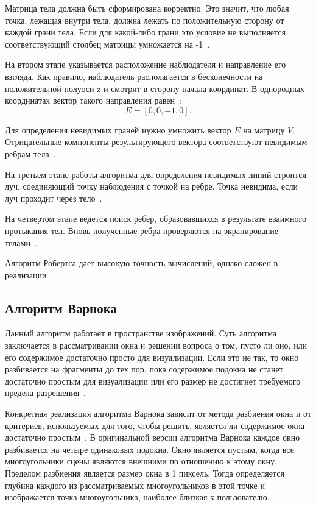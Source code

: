 Матрица тела должна быть сформирована корректно. Это значит, что любая
точка, лежащая внутри тела, должна лежать по положительную сторону от каждой
грани тела. Если для какой-либо грани это условие не выполняется,
соответствующий столбец матрицы умножается на -1~\cite{rojers}.

На втором этапе указывается расположение наблюдателя и направление его
взгляда. Как правило, наблюдатель располагается в бесконечности на
положительной полуоси z и смотрит в сторону начала координат. В однородных
координатах вектор такого направления равен~\cite{rojers}:
$$
	E = [0, 0, -1, 0].
$$

Для определения невидимых граней нужно умножить вектор $E$ на матрицу $V$. Отрицательные компоненты результирующего вектора соответствуют
невидимым ребрам тела~\cite{rojers}.

На третьем этапе работы алгоритма для определения невидимых линий
строится луч, соединяющий точку наблюдения с точкой на ребре. Точка невидима,
если луч проходит через тело~\cite{rojers}.

На четвертом этапе ведется поиск ребер, образовавшихся в результате
взаимного протыкания тел. Вновь полученные ребра проверяются на
экранирование телами~\cite{rojers}.

Алгоритм Робертса дает высокую точность вычислений, однако сложен в
реализации~\cite{rojers}.

\subsection{Алгоритм Варнока}

Данный алгоритм работает в пространстве изображений. Суть алгоритма заключается в рассматривании окна и решении вопроса о том, пусто ли оно, или его
содержимое достаточно просто для визуализации. Если это не так, то окно
разбивается на фрагменты до тех пор, пока содержимое подокна не станет достаточно простым для визуализации или его размер не достигнет требуемого
предела разрешения~\cite{rojers}.

Конкретная реализация алгоритма Варнока зависит от метода разбиения
окна и от критериев, используемых для того, чтобы решить, является ли
содержимое окна достаточно простым~\cite{rojers}. В оригинальной версии алгоритма Варнока
каждое окно разбивается на четыре одинаковых подокна. Окно является пустым,
когда все многоугольники сцены являются внешними по отношению к этому окну.
Пределом разбиения является размер окна в 1 пиксель. Тогда определяется глубина
каждого из рассматриваемых многоугольников в этой точке и изображается точка
многоугольника, наиболее близкая к пользователю.

